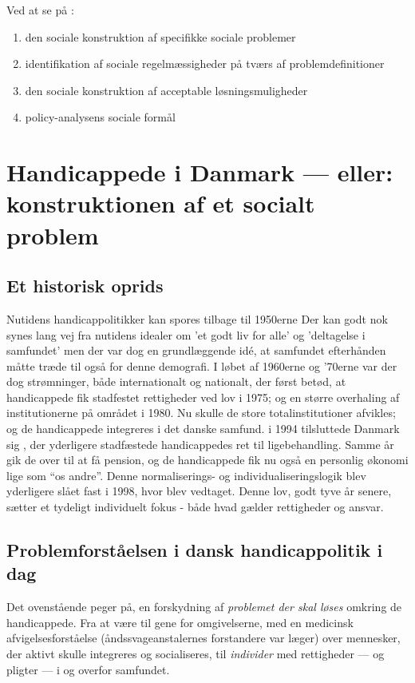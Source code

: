 Ved at se på \cite[s. 300]{scheurichPolicyArchaeologyNew1994}:
\begin{enumerate}
  \item
    den sociale konstruktion af specifikke sociale problemer
  \item
    identifikation af sociale regelmæssigheder på tværs af problemdefinitioner
  \item
    den sociale konstruktion af acceptable løsningsmuligheder
  \item
    policy-analysens sociale formål
\end{enumerate}


\section{Handicappede i Danmark — eller: konstruktionen af et socialt problem}

\subsection{Et historisk oprids}

Nutidens handicappolitikker kan spores tilbage til 1950erne
Der kan godt nok synes lang vej fra nutidens idealer om 'et godt liv for alle' og 'deltagelse i samfundet' men der var dog en grundlæggende idé, at samfundet efterhånden måtte træde til også for denne demografi.
I løbet af 1960erne og '70erne var der dog strømninger, både internationalt og nationalt, der først betød, at handicappede fik stadfestet rettigheder ved lov i 1975; og en større overhaling af institutionerne på området i 1980.
Nu skulle de store totalinstitutioner afvikles; og de handicappede integreres i det danske samfund. 
i 1994 tilsluttede Danmark sig , der yderligere stadfæstede handicappedes ret til ligebehandling. Samme år gik de over til at få pension, og de handicappede fik nu også en personlig økonomi lige som “os andre”.
Denne normaliserings- og individualiseringslogik blev yderligere slået fast i 1998, hvor  blev vedtaget.
Denne lov, godt tyve år senere, sætter et tydeligt individuelt fokus - både hvad gælder rettigheder og ansvar.

\subsection{Problemforståelsen i dansk handicappolitik i dag}
Det ovenstående peger på, en forskydning af \textit{problemet der skal løses} omkring de handicappede.
Fra at være til gene for omgivelserne, med en medicinsk afvigelsesforståelse (åndssvageanstalernes forstandere var læger) over mennesker, der aktivt skulle integreres og socialiseres, til \textit{individer} med rettigheder — og pligter — i og overfor samfundet.

